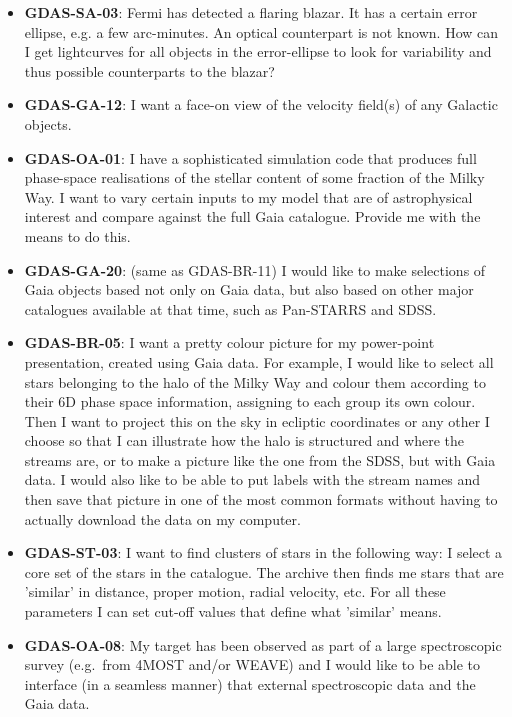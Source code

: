 \documentclass[longauth, final]{aa}
\begin{document}
\begin{itemize}
\item{\bf GDAS-SA-03}: Fermi has detected a flaring blazar. It has a certain error ellipse, e.g. a few arc-minutes. An optical counterpart is not known. How can I get lightcurves for all objects in the error-ellipse to look for variability and thus possible counterparts to the blazar? 

\item{\bf GDAS-GA-12}:  I want a face-on view of the velocity field(s) of any Galactic objects. 

\item{\bf GDAS-OA-01}: I have a sophisticated simulation code that produces full phase-space realisations of the stellar content of some fraction of the Milky Way. I want to vary certain inputs to my model that are of astrophysical interest and compare against the full Gaia catalogue. Provide me with the means to do this.

\item{\bf GDAS-GA-20}: (same as GDAS-BR-11) I would like to make selections of Gaia objects based not only on Gaia data, but also based on other major catalogues available at that time, such as Pan-STARRS and SDSS. 

\item{\bf GDAS-BR-05}: I want a pretty colour picture for my power-point presentation, created using Gaia data. For example, I would like to select all stars belonging to the halo of the Milky Way and colour them according to their 6D phase space information, assigning to each group its own colour. Then I want to project this on the sky in ecliptic coordinates or any other I choose so that I can illustrate how the halo is structured and where the streams are, or to make a picture like the one from the SDSS, but with Gaia data. I would also like to be able to put labels with the stream names and then save that picture in one of the most common formats without having to actually download the data on my computer. 

\item{\bf GDAS-ST-03}: I want to find clusters of stars in the following way: I select a core set of the stars in the catalogue. The archive then finds me stars that are 'similar' in distance, proper motion, radial velocity, etc. For all these parameters I can set cut-off values that define what 'similar' means. 

\item{\bf GDAS-OA-08}: My target has been observed as part of a large spectroscopic survey (e.g.~from 4MOST and/or WEAVE)  and I would like to be able to interface (in a seamless manner) that external spectroscopic data and the Gaia data.


\end{itemize}
\end{document}
